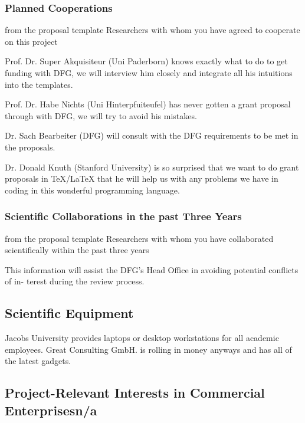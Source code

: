 \subsubsection{Planned Cooperations}\label{sec:coop:planned}
\begin{todo}{from the proposal template}
  Researchers with whom you have agreed to cooperate on this project
\end{todo}
\begin{compactdesc}
\item[Prof. Dr. Super Akquisiteur (Uni Paderborn)] knows exactly what to do to get funding
  with DFG, we will interview him closely and integrate all his intuitions into the {\pn}
  templates.
\item[Prof. Dr. Habe Nichts (Uni Hinterpfuiteufel)] has never gotten a grant proposal
  through with DFG, we will try to avoid his mistakes.
\item[Dr. Sach Bearbeiter (DFG)] will consult with the DFG requirements to be met in the
  proposals.
\item[Dr. Donald Knuth (Stanford University)] is so surprised that we want to do grant
  proposals in {\TeX/\LaTeX} that he will help us with any problems we have in coding in
  this wonderful programming language.
\end{compactdesc}

\subsubsection{Scientific Collaborations in the past Three Years}\label{sec:past-coop}

\begin{todo}{from the proposal template}
  Researchers with whom you have collaborated scientifically within the past three years

  This information will assist the DFG’s Head Office in avoiding potential conflicts of
  in- terest during the review process.
\end{todo}

\subsection{Scientific Equipment}\label{sec:req:equipment}

Jacobs University provides laptops or desktop workstations for all academic
employees. Great Consulting GmbH. is rolling in money anyways and has all of the latest
gadgets.


\subsection{Project-Relevant Interests in Commercial Enterprises\qquad n/a}


